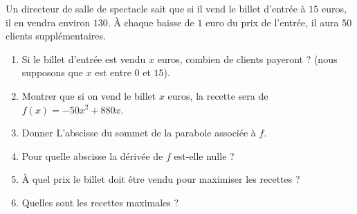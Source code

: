 
\begin{exercice}\label{exosmath-0403}

    Un directeur de salle de spectacle sait que si il vend le billet d'entrée à $15$ euros, il en vendra environ \( 130\). À chaque baisse de \( 1\) euro du prix de l'entrée, il aura \( 50\) clients supplémentaires.

    \begin{enumerate}
        \item
            Si le billet d'entrée est vendu \( x\) euros, combien de clients payeront ? (nous supposons que \( x\) est entre \( 0\) et \( 15\)).
        \item
            Montrer que si on vend le billet \( x\) euros, la recette sera de \( f(x)=-50x^2+880x\).
        \item
            Donner L'abscisse du sommet de la parabole associée à \( f\).
        \item
            Pour quelle abscisse la dérivée de \( f\) est-elle nulle ?
        \item
            À quel prix le billet doit être vendu pour maximiser les recettes ?
        \item
            Quelles sont les recettes maximales ?
    \end{enumerate}

\end{exercice}
